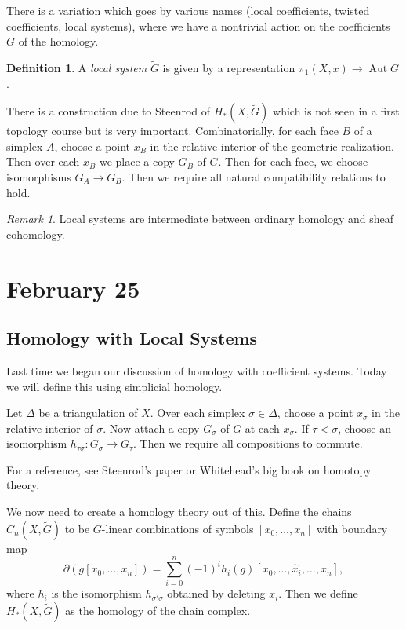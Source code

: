 \documentclass[leqno, openany]{memoir}
\theoremstyle{definition}
\newtheorem{defn}[thm]{Definition}
\theoremstyle{remark}
\newtheorem{rmk}[thm]{Remark}
\theoremstyle{plain}
\theoremstyle{definition}
\theoremstyle{remark}
\DeclareMathOperator{\Aut}{Aut}
\begin{document}
There is a variation which goes by various names (local coefficients, twisted
coefficients, local systems), where we have a nontrivial action on the
coefficients $G$ of the homology.

\begin{defn} A \textit{local system} $\widetilde{G}$ is given by a
representation $\pi_1(X, x) \to \Aut G$.  \end{defn}

There is a construction due to Steenrod of $H_*(X, \widetilde{G})$ which is not
seen in a first topology course but is very important. Combinatorially, for
each face $B$ of a simplex $A$, choose a point $x_B$ in the relative interior
of the geometric realization. Then over each $x_B$ we place a copy $G_B$ of
$G$. Then for each face, we choose isomorphisms $G_A \to G_B$. Then we require
all natural compatibility relations to hold.

\begin{rmk} Local systems are intermediate between ordinary homology and sheaf
cohomology.  \end{rmk}

\chapter{February 25}%

\section{Homology with Local Systems}%

Last time we began our discussion of homology with coefficient systems. Today
we will define this using simplicial homology.

Let $\Delta$ be a triangulation of $X$. Over each simplex $\sigma \in \Delta$,
choose a point $x_{\sigma}$ in the relative interior of $\sigma$. Now attach a
copy $G_{\sigma}$ of $G$ at each $x_{\sigma}$. If $\tau < \sigma$, choose an
isomorphism $h_{\tau \sigma}: G_{\sigma} \to G_{\tau}$. Then we require all
compositions to commute.

For a reference, see Steenrod's paper or Whitehead's big book on homotopy
theory.

We now need to create a homology theory out of this. Define the chains $C_n(X,
\widetilde{G})$ to be $G$-linear combinations of symbols $[x_0, \ldots, x_n]$
with boundary map \[ \partial(g[x_0, \ldots, x_n]) = \sum_{i=0}^n (-1)^i h_i(g)
[x_0, \ldots, \widehat{x}_i, \ldots, x_n], \] where $h_i$ is the isomorphism
$h_{\sigma'\sigma}$ obtained by deleting $x_i$. Then we define $H_*(X,
\widetilde{G})$ as the homology of the chain complex.
\end{document}
